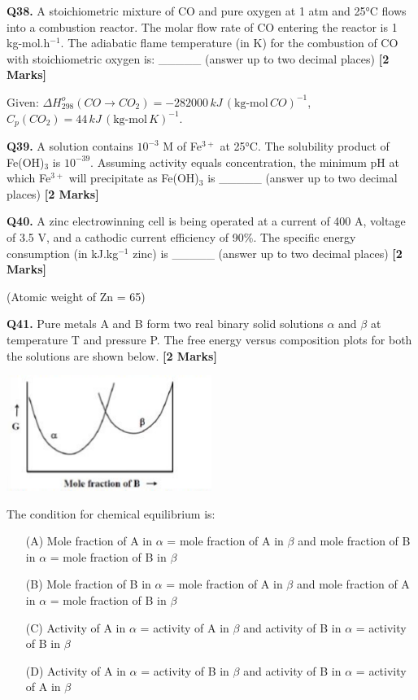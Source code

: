 \documentclass[11pt]{article}
\newcommand{\questionb}[2]{
    \noindent\textbf{Q#2.} #1 \hfill \textbf{[2 Marks]}
}
\begin{document}
\questionb{A stoichiometric mixture of CO and pure oxygen at 1 atm and 25°C flows into a combustion reactor. The molar flow rate of CO entering the reactor is 1 kg-mol.h\(^{-1}\). The adiabatic flame temperature (in K) for the combustion of CO with stoichiometric oxygen is: \_\_\_\_\_ (answer up to two decimal places)}{38}
Given: \(\Delta H_{298}^o (CO \rightarrow CO_2) = -282000 \, kJ \, (\text{kg-mol} \, CO)^{-1}\), \(C_p (CO_2) = 44 \, kJ \, (\text{kg-mol} \, K)^{-1}\).
\vspace{0.5cm}

\questionb{A solution contains \(10^{-3}\) M of Fe\(^{3+}\) at 25°C. The solubility product of Fe(OH)\(_3\) is \(10^{-39}\). Assuming activity equals concentration, the minimum pH at which Fe\(^{3+}\) will precipitate as Fe(OH)\(_3\) is \_\_\_\_\_ (answer up to two decimal places)}{39}
\vspace{0.5cm}

\questionb{A zinc electrowinning cell is being operated at a current of 400 A, voltage of 3.5 V, and a cathodic current efficiency of 90\%. The specific energy consumption (in kJ.kg\(^{-1}\) zinc) is \_\_\_\_\_ (answer up to two decimal places)}{40}
(Atomic weight of Zn = 65)
\vspace{0.5cm}

\questionb{Pure metals A and B form two real binary solid solutions \(\alpha\) and \(\beta\) at temperature T and pressure P. The free energy versus composition plots for both the solutions are shown below.}{41}
\begin{center}
\includegraphics[width=0.5\textwidth]{figures/41.png}
\end{center}
The condition for chemical equilibrium is:
\begin{enumerate}
    \item[(A)] Mole fraction of A in \(\alpha\) = mole fraction of A in \(\beta\) and mole fraction of B in \(\alpha\) = mole fraction of B in \(\beta\)
    \item[(B)] Mole fraction of B in \(\alpha\) = mole fraction of A in \(\beta\) and mole fraction of A in \(\alpha\) = mole fraction of B in \(\beta\)
    \item[(C)] Activity of A in \(\alpha\) = activity of A in \(\beta\) and activity of B in \(\alpha\) = activity of B in \(\beta\)
    \item[(D)] Activity of A in \(\alpha\) = activity of B in \(\beta\) and activity of B in \(\alpha\) = activity of A in \(\beta\)
\end{enumerate}
\vspace{0.5cm}
\end{document}
